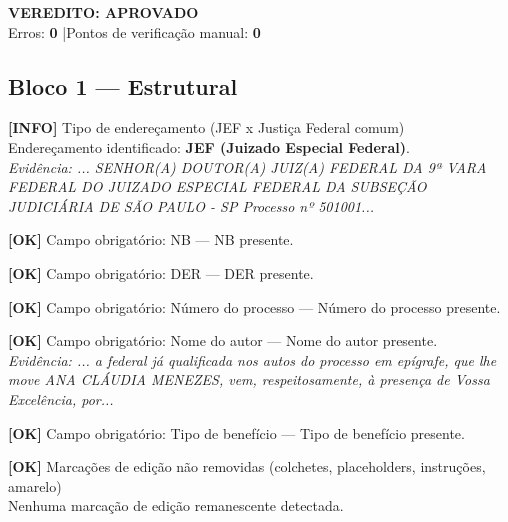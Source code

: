 \documentclass[12pt,a4paper]{article}
\newcommand{\statusOK}[1]{\textcolor{corOK}{\textbf{[OK]}} #1}
\newcommand{\statusINFO}[1]{\textcolor{corINFO}{\textbf{[INFO]}} #1}
\begin{document}
\vspace{0.5em}

\noindent\colorbox{corFundoAprovado}{%
  \begin{minipage}{\dimexpr\linewidth-2\fboxsep}
    \centering
    \vspace{0.3em}
    {\large \textcolor{corOK}{\textbf{VEREDITO: APROVADO}}}\\
    Erros: \textbf{0} \quad|\quad Pontos de verificação manual: \textbf{0}
    \vspace{0.3em}
  \end{minipage}%
}

\vspace{1em}


\subsection{Bloco 1 --- Estrutural}

\statusINFO{Tipo de endereçamento (JEF x Justiça Federal comum)}\\
Endereçamento identificado: \textbf{JEF (Juizado Especial Federal)}.\\
\textit{Evidência: ... SENHOR(A) DOUTOR(A) JUIZ(A) FEDERAL DA 9ª VARA FEDERAL DO JUIZADO ESPECIAL FEDERAL DA SUBSEÇÃO JUDICIÁRIA DE SÃO PAULO - SP Processo nº 501001...}

\medskip
\statusOK{Campo obrigatório: NB} --- NB presente.

\medskip
\statusOK{Campo obrigatório: DER} --- DER presente.

\medskip
\statusOK{Campo obrigatório: Número do processo} --- Número do processo presente.

\medskip
\statusOK{Campo obrigatório: Nome do autor} --- Nome do autor presente.\\
\textit{Evidência: ... a federal já qualificada nos autos do processo em epígrafe, que lhe move ANA CLÁUDIA MENEZES, vem, respeitosamente, à presença de Vossa Excelência, por...}

\medskip
\statusOK{Campo obrigatório: Tipo de benefício} --- Tipo de benefício presente.

\medskip
\statusOK{Marcações de edição não removidas (colchetes, placeholders, instruções, amarelo)}\\
Nenhuma marcação de edição remanescente detectada.
\end{document}

